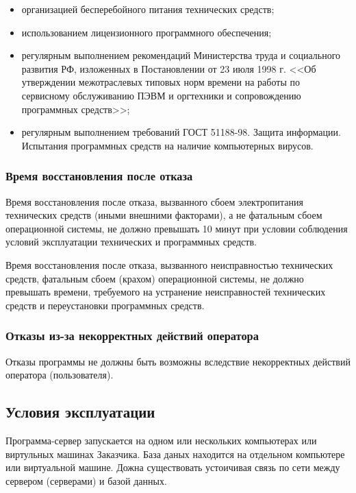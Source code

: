 \documentclass[a4page]{article}
\begin{document}
\begin{itemize}
  \item организацией бесперебойного питания технических средств;
  \item использованием лицензионного программного обеспечения;
  \item регулярным выполнением рекомендаций Министерства труда и социального развития РФ, изложенных в Постановлении от 23 июля 1998 г. <<Об утверждении межотраслевых типовых норм времени на работы по сервисному обслуживанию ПЭВМ и оргтехники и сопровождению программных средств>>;
  \item регулярным выполнением требований ГОСТ 51188-98. Защита информации. Испытания программных средств на наличие компьютерных вирусов.
\end{itemize}

\subsubsection{Время восстановления после отказа}

Время восстановления после отказа, вызванного сбоем электропитания технических средств (иными внешними факторами), а не фатальным сбоем операционной системы, не должно превышать 10 минут при условии соблюдения условий эксплуатации технических и программных средств.

Время восстановления после отказа, вызванного неисправностью технических средств, фатальным сбоем (крахом) операционной системы, не должно превышать времени, требуемого на устранение неисправностей технических средств и переустановки программных средств.

\subsubsection{Отказы из-за некорректных действий оператора}

Отказы программы не должны быть возможны вследствие некорректных действий оператора (пользователя). 

\subsection{Условия эксплуатации}

Программа-сервер запускается на одном или нескольких компьютерах или виртульных машинах Заказчика. База даных находится на отдельном компьютере или виртуальной машине. Дожна существовать устоичивая связь по сети между сервером (серверами) и базой данных.
\end{document}
